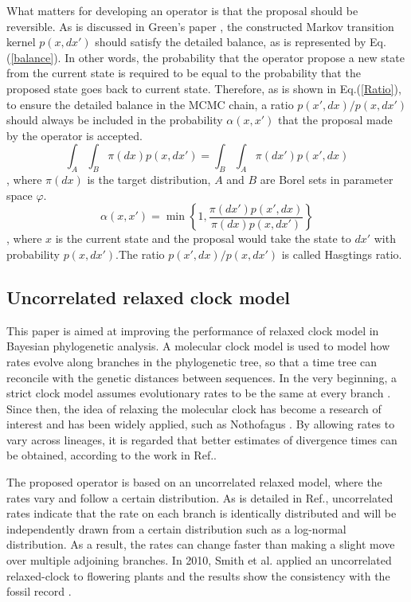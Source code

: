 \documentclass{bmcart}
\begin{document}
What matters for developing an operator is that the proposal should be reversible. As is discussed in Green's paper \cite{green1995reversible}, the constructed Markov transition kernel $p(x,dx')$ should satisfy the detailed balance, as is represented by Eq.(\ref{balance}). In other words, the probability that the operator propose a new state from the current state is required to be equal to the probability that the proposed state goes back to current state. Therefore, as is shown in Eq.(\ref{Ratio}), to ensure the detailed balance in the MCMC chain, a ratio ${p(x',dx)}/{p(x,dx')}$ should always be included in the probability $\alpha(x,x')$ that the proposal made by the operator is accepted.
\begin{equation}\label{balance}
\int_A {\int_B {\pi (dx)p(x,dx')} }  = \int_B {\int_A {\pi (dx')p(x',dx)} }
\end{equation}
, where ${\pi (dx)}$ is the target distribution, $A$ and $B$ are Borel sets in parameter space $\varphi$.
\begin{equation}\label{Ratio}
{\alpha}(x,x') = \min \left\{ {1,\frac{{\pi (dx'){p}(x',dx)}}{{\pi (dx){p}(x,dx')}}} \right\}
\end{equation}
, where $x$ is the current state and the proposal would take the state to $dx'$ with probability ${p(x,dx')}$.The ratio ${p(x',dx)}/{p(x,dx')}$ is called Hasgtings ratio.
\subsection*{Uncorrelated relaxed clock model}
This paper is aimed at improving the performance of relaxed clock model in Bayesian phylogenetic analysis. A molecular clock model is used to model how rates evolve along branches in the phylogenetic tree, so that a time tree can reconcile with the genetic distances between sequences. In the very beginning, a strict clock model assumes evolutionary rates to be the same at every branch \cite{zuckerkandl1965evolutionary}. Since then, the idea of relaxing the molecular clock has become a research of interest and has been widely applied, such as Nothofagus \cite{knapp2005relaxed}. By allowing rates to vary across lineages, it is regarded that better estimates of divergence times can be obtained, according to the work in Ref.\cite{ho2005accuracy,renner2005relaxed,lepage2007general}. 

 The proposed operator is based on an uncorrelated relaxed model, where the rates vary and follow a certain distribution. As is detailed in Ref.\cite{drummond2006relaxed}, uncorrelated rates indicate that the rate on each branch is identically distributed and will be independently drawn from a certain distribution such as a log-normal distribution. As a result, the rates can change faster than making a slight move over multiple adjoining branches. In 2010, Smith et al. applied an uncorrelated relaxed-clock to flowering plants and the results show the consistency with the fossil record \cite{smith2010uncorrelated}.
\end{document}
